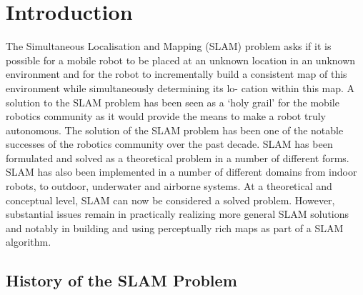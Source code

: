 \documentclass[12pt]{article}
\begin{document}
\doublespacing
\section{Introduction}
The Simultaneous Localisation and Mapping (SLAM) problem asks if it is possible for a mobile robot to be placed at an unknown location in an unknown environment and for the robot to incrementally build a consistent map of this environment while simultaneously determining its lo- cation within this map. A solution to the SLAM problem has been seen as a ‘holy grail’ for the mobile robotics community as it would provide the means to make a robot truly autonomous. The solution of the SLAM problem has been one of
the notable successes of the robotics community over the past decade. SLAM has been formulated and solved as a theoretical problem in a number of different forms. SLAM has also been implemented in a number of different domains from indoor robots, to outdoor, underwater and airborne systems. At a theoretical and conceptual level, SLAM can now be considered a solved problem. However, substantial issues remain in practically realizing more general SLAM solutions and notably in building and using perceptually rich maps as part of a SLAM algorithm.
\subsection{History of the SLAM Problem}
\end{document}

